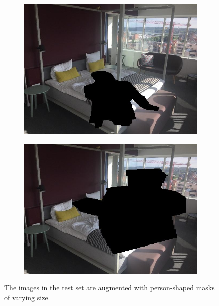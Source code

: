\begin{figure}
    \centering
    \begin{subfigure}[b]{.49\columnwidth}
        \centering
        \includegraphics[width=.95\columnwidth]{figures/chapter5/example_masks/1.jpg}
    \end{subfigure}
    \begin{subfigure}[b]{.49\columnwidth}
        \centering
        \includegraphics[width=.95\columnwidth]{figures/chapter5/example_masks/3.jpg}
    \end{subfigure}
    \caption{The images in the test set are augmented with person-shaped masks of varying size.}
    \label{fig:example_masks}
\end{figure}

